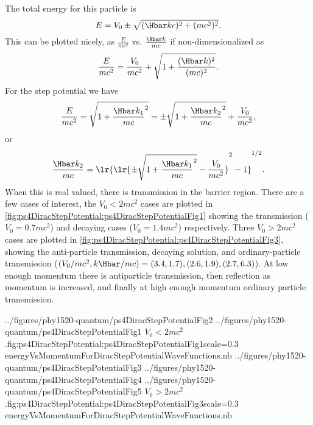 The total energy for this particle is
%
\begin{equation}\label{eqn:gradQuantumProblemSet4Problem3:560}
E = V_0 \pm \sqrt{(\Hbar k c)^2 + (m c^2)^2}.
\end{equation}
%
This can be plotted nicely, as \( \frac{E}{m c^2} \) vs. \( \frac{\Hbar k}{m c} \) if non-dimensionalized as
%
\begin{equation}\label{eqn:gradQuantumProblemSet4Problem3:580}
\frac{E}{m c^2} = \frac{V_0}{m c^2} + \sqrt{1 + \frac{(\Hbar k)^2}{(m c)^2} }.
\end{equation}
%
For the step potential we have
%
\begin{dmath}\label{eqn:gradQuantumProblemSet4Problem3:600}
\frac{E}{m c^2}
= \sqrt{ 1 + {\frac{ \Hbar k_1}{m c} }^2 }
= \pm \sqrt{ 1 + {\frac{ \Hbar k_2}{m c} }^2 } + \frac{V_0}{m c^2},
\end{dmath}
%
or
\begin{dmath}\label{eqn:gradQuantumProblemSet4Problem3:620}
\frac{ \Hbar k_2}{m c}
=
\lr{ \lr{ \pm \sqrt{ 1 + {\frac{ \Hbar k_1}{m c} }^2 } - \frac{V_0}{m c^2} }^2 - 1 }^{1/2}.
\end{dmath}
%
When this is real valued, there is transmission in the barrier region.  There are a few cases of interest, the \( V_0 < 2 m c^2 \) cases are plotted in \cref{fig:ps4DiracStepPotential:ps4DiracStepPotentialFig1} showing the transmission (\( V_0 = 0.7 m c^2 \)) and decaying cases (\( V_0 = 1.4 m c^2 \)) respectively.
Three \( V_0 > 2 m c^2 \) cases are plotted in \cref{fig:ps4DiracStepPotential:ps4DiracStepPotentialFig3},
showing the
anti-particle transmission,
decaying solution,
and ordinary-particle transmission
(\( (V_0/m c^2,k \Hbar/m c) = (3.4,1.7), (2.6,1.9), (2.7,6.3) \)).  At low enough momentum there is antiparticle transmission, then reflection as momentum is increased, and finally at high enough momentum ordinary particle transmission.

\mathImageTwoFigures
{../figures/phy1520-quantum/ps4DiracStepPotentialFig2}
{../figures/phy1520-quantum/ps4DiracStepPotentialFig1}
{\( V_0 < 2 m c^2 \).}{fig:ps4DiracStepPotential:ps4DiracStepPotentialFig1}{scale=0.3}
{energyVsMomentumForDiracStepPotentialWaveFunctions.nb}
\mathImageThreeFiguresOneLine
{../figures/phy1520-quantum/ps4DiracStepPotentialFig3}
{../figures/phy1520-quantum/ps4DiracStepPotentialFig4}
{../figures/phy1520-quantum/ps4DiracStepPotentialFig5}
{\( V_0 > 2 m c^2 \).}{fig:ps4DiracStepPotential:ps4DiracStepPotentialFig3}{scale=0.3}
{energyVsMomentumForDiracStepPotentialWaveFunctions.nb}


